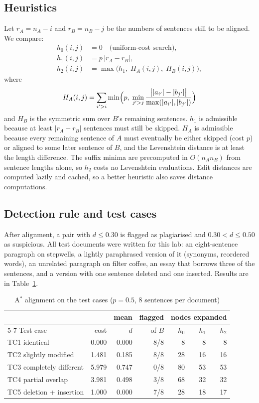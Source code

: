 \documentclass[journal]{IEEEtran}
\begin{document}
\subsection{Heuristics}
Let $r_A = n_A-i$ and $r_B=n_B-j$ be the numbers of sentences still to be aligned. We compare:
\begin{align}
h_0(i,j) &= 0 \quad\text{(uniform-cost search)},\\
h_1(i,j) &= p\,\lvert r_A - r_B\rvert,\\
h_2(i,j) &= \max\bigl(h_1,\; H_A(i,j),\; H_B(i,j)\bigr),
\end{align}
where
\begin{equation}
H_A(i,j) = \sum_{i'>i} \min\Bigl(p,\; \min_{j'>j} \frac{\bigl||a_{i'}|-|b_{j'}|\bigr|}{\max(|a_{i'}|,|b_{j'}|)}\Bigr)
\end{equation}
and $H_B$ is the symmetric sum over $B$'s remaining sentences. $h_1$ is admissible because at
least $\lvert r_A-r_B\rvert$ sentences must still be skipped. $H_A$ is admissible because every
remaining sentence of $A$ must eventually be either skipped (cost $p$) or aligned to some later
sentence of $B$, and the Levenshtein distance is at least the length difference. The suffix
minima are precomputed in $O(n_An_B)$ from sentence lengths alone, so $h_2$ costs no
Levenshtein evaluations. Edit distances are computed lazily and cached, so a better heuristic
also saves distance computations.

\subsection{Detection rule and test cases}
After alignment, a pair with $d\le 0.30$ is flagged as plagiarised and $0.30<d\le0.50$ as
suspicious. All test documents were written for this lab: an eight-sentence paragraph on
stepwells, a lightly paraphrased version of it (synonyms, reordered words), an unrelated
paragraph on filter coffee, an essay that borrows three of the sentences, and a version with
one sentence deleted and one inserted. Results are in Table~\ref{tab:lab2}.

\begin{table}[t]
\centering
\caption{A$^*$ alignment on the test cases ($p=0.5$, 8 sentences per document)}\label{tab:lab2}
\setlength{\tabcolsep}{3.5pt}
\begin{tabular}{@{}lrrrrrr@{}}
\toprule
& & mean & flagged & \multicolumn{3}{c}{nodes expanded} \\
\cmidrule(l){5-7}
Test case & cost & $d$ & of $B$ & $h_0$ & $h_1$ & $h_2$ \\
\midrule
TC1 identical            & 0.000 & 0.000 & 8/8 & 8  & 8  & 8 \\
TC2 slightly modified    & 1.481 & 0.185 & 8/8 & 28 & 16 & 16 \\
TC3 completely different & 5.979 & 0.747 & 0/8 & 80 & 53 & 53 \\
TC4 partial overlap      & 3.981 & 0.498 & 3/8 & 68 & 32 & 32 \\
TC5 deletion + insertion & 1.000 & 0.000 & 7/8 & 28 & 18 & 17 \\
\bottomrule
\end{tabular}
\end{table}
\end{document}
